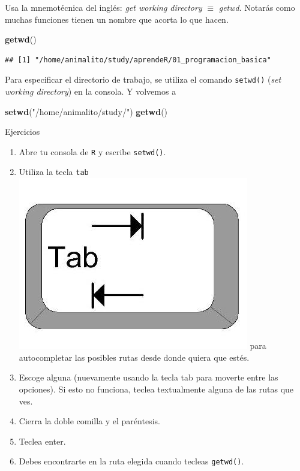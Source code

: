 \documentclass[]{article}
\newenvironment{Shaded}{\begin{snugshade}}{\end{snugshade}}
\newcommand{\KeywordTok}[1]{\textcolor[rgb]{0.13,0.29,0.53}{\textbf{#1}}}
\newcommand{\StringTok}[1]{\textcolor[rgb]{0.31,0.60,0.02}{#1}}
\newcommand{\NormalTok}[1]{#1}
\begin{document}
\begin{curiosidad} 
Usa la mnemotécnica del inglés: \textit{get working directory} $\equiv$ \textit{getwd}. 
Notarás como muchas funciones tienen un nombre que acorta lo que hacen.
\end{curiosidad}

\begin{Shaded}
\begin{Highlighting}[]
\KeywordTok{getwd}\NormalTok{()}
\end{Highlighting}
\end{Shaded}

\begin{verbatim}
## [1] "/home/animalito/study/aprendeR/01_programacion_basica"
\end{verbatim}

Para especificar el directorio de trabajo, se utiliza el comando
\texttt{setwd()} (\emph{set working directory}) en la consola. Y
volvemos a

\begin{Shaded}
\begin{Highlighting}[]
\KeywordTok{setwd}\NormalTok{(}\StringTok{"/home/animalito/study/"}\NormalTok{)}
\KeywordTok{getwd}\NormalTok{()}
\end{Highlighting}
\end{Shaded}

\renewcommand\bcStyleTitre[1]{\large\textcolor{bbblack}{#1}}

\begin{bclogo}[
  couleur=llred,
  arrondi=0,
  logo=\bcstop,
  barre=none,
  noborder=true]{Ejercicios}
\begin{enumerate}
\item Abre tu consola de \texttt{R} y escribe \texttt{setwd()}. 
\item{Utiliza la tecla \texttt{tab}
\includegraphics[scale=0.5]{../img/tab_key.jpg}
para autocompletar las posibles rutas desde donde quiera que estés.}
\item Escoge alguna (nuevamente usando la tecla tab para moverte entre las opciones). Si esto no funciona, teclea textualmente alguna de las rutas que ves.
\item Cierra la doble comilla y el paréntesis.
\item Teclea enter.
\item Debes encontrarte en la ruta elegida cuando tecleas \texttt{getwd()}.
\end{enumerate}
\end{bclogo}
\end{document}
